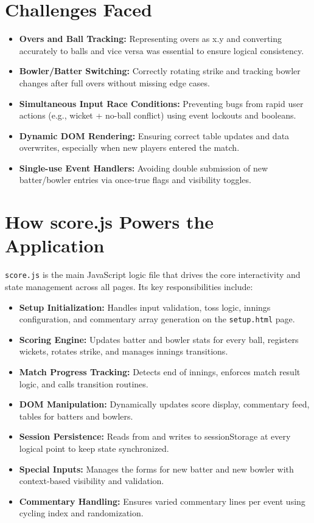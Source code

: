 \documentclass[a4paper,10pt]{article}
\begin{document}
\section{Challenges Faced}
\begin{itemize}
    \item \textbf{Overs and Ball Tracking:} Representing overs as x.y and converting accurately to balls and vice versa was essential to ensure logical consistency.
    \item \textbf{Bowler/Batter Switching:} Correctly rotating strike and tracking bowler changes after full overs without missing edge cases.
    \item \textbf{Simultaneous Input Race Conditions:} Preventing bugs from rapid user actions (e.g., wicket + no-ball conflict) using event lockouts and booleans.
    \item \textbf{Dynamic DOM Rendering:} Ensuring correct table updates and data overwrites, especially when new players entered the match.
    \item \textbf{Single-use Event Handlers:} Avoiding double submission of new batter/bowler entries via once-true flags and visibility toggles.
\end{itemize}



\section{How score.js Powers the Application}
\texttt{score.js} is the main JavaScript logic file that drives the core interactivity and state management across all pages. Its key responsibilities include:
\begin{itemize}
    \item \textbf{Setup Initialization:} Handles input validation, toss logic, innings configuration, and commentary array generation on the \texttt{setup.html} page.
    \item \textbf{Scoring Engine:} Updates batter and bowler stats for every ball, registers wickets, rotates strike, and manages innings transitions.
    \item \textbf{Match Progress Tracking:} Detects end of innings, enforces match result logic, and calls transition routines.
    \item \textbf{DOM Manipulation:} Dynamically updates score display, commentary feed, tables for batters and bowlers.
    \item \textbf{Session Persistence:} Reads from and writes to sessionStorage at every logical point to keep state synchronized.
    \item \textbf{Special Inputs:} Manages the forms for new batter and new bowler with context-based visibility and validation.
    \item \textbf{Commentary Handling:} Ensures varied commentary lines per event using cycling index and randomization.
\end{itemize}
\end{document}
